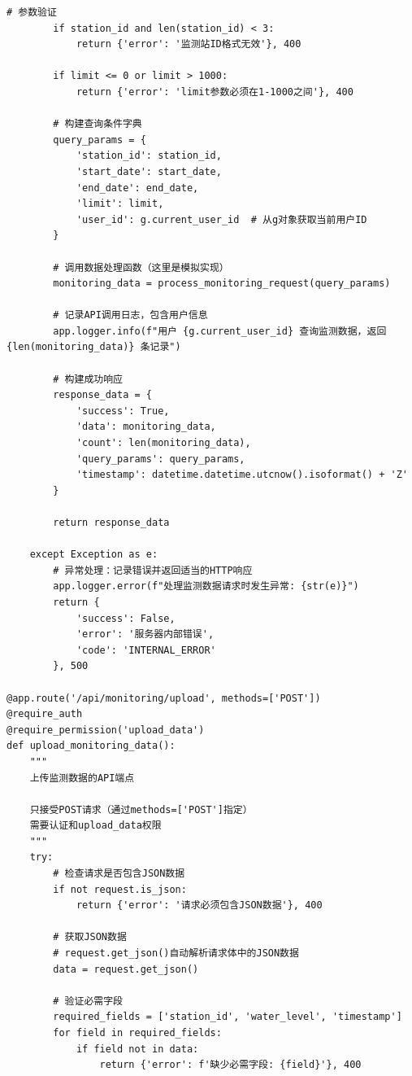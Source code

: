 \begin{lstlisting}[style=python]
        # 参数验证
        if station_id and len(station_id) < 3:
            return {'error': '监测站ID格式无效'}, 400
        
        if limit <= 0 or limit > 1000:
            return {'error': 'limit参数必须在1-1000之间'}, 400
        
        # 构建查询条件字典
        query_params = {
            'station_id': station_id,
            'start_date': start_date,
            'end_date': end_date,
            'limit': limit,
            'user_id': g.current_user_id  # 从g对象获取当前用户ID
        }
        
        # 调用数据处理函数（这里是模拟实现）
        monitoring_data = process_monitoring_request(query_params)
        
        # 记录API调用日志，包含用户信息
        app.logger.info(f"用户 {g.current_user_id} 查询监测数据，返回 {len(monitoring_data)} 条记录")
        
        # 构建成功响应
        response_data = {
            'success': True,
            'data': monitoring_data,
            'count': len(monitoring_data),
            'query_params': query_params,
            'timestamp': datetime.datetime.utcnow().isoformat() + 'Z'
        }
        
        return response_data
        
    except Exception as e:
        # 异常处理：记录错误并返回适当的HTTP响应
        app.logger.error(f"处理监测数据请求时发生异常: {str(e)}")
        return {
            'success': False,
            'error': '服务器内部错误',
            'code': 'INTERNAL_ERROR'
        }, 500

@app.route('/api/monitoring/upload', methods=['POST'])
@require_auth
@require_permission('upload_data')
def upload_monitoring_data():
    """
    上传监测数据的API端点
    
    只接受POST请求（通过methods=['POST']指定）
    需要认证和upload_data权限
    """
    try:
        # 检查请求是否包含JSON数据
        if not request.is_json:
            return {'error': '请求必须包含JSON数据'}, 400
        
        # 获取JSON数据
        # request.get_json()自动解析请求体中的JSON数据
        data = request.get_json()
        
        # 验证必需字段
        required_fields = ['station_id', 'water_level', 'timestamp']
        for field in required_fields:
            if field not in data:
                return {'error': f'缺少必需字段: {field}'}, 400
        

\end{lstlisting}
